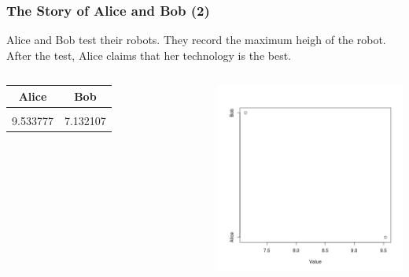 \documentclass[10pt]{beamer}
\begin{document}
\begin{frame}
  \frametitle{The Story of Alice and Bob (2)}
  \begin{block}{}
    Alice and Bob test their robots. They record the maximum heigh of
    the robot. After the test, Alice claims that her technology is the
    best.
  \end{block}
  \begin{columns}[c]
    \begin{tabular}{c|c}
      Alice & Bob \\
      \hline\\
      9.533777 & 7.132107
    \end{tabular}
    \includegraphics[width=1\textwidth]{img/AliceBob_1}
  \end{columns}
\end{frame}
\end{document}
